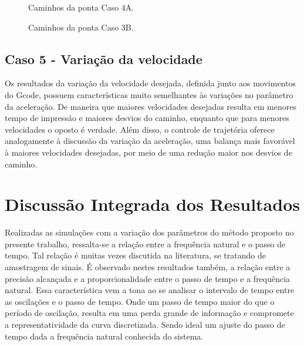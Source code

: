 \begin{figure}[H]
    \centering
    \hfill
    \caption{Caminhos da ponta Caso 4A.}
    \label{fig:4A_cam_p_s}
\end{figure}

\begin{figure}[H]
    \centering
    \hfill
    \caption{Caminhos da ponta Caso 3B.}
    \label{fig:4B_cam_p_s}
\end{figure}

\subsection{Caso 5 - Variação da velocidade}
Os resultados da variação da velocidade desejada, definida junto aos movimentos do Gcode, possuem características muito semelhantes às variações no parâmetro da aceleração. De maneira que maiores velocidades desejadas resulta em menores tempo de impressão e maiores desvios do caminho, enquanto que para menores velocidades o oposto é verdade. Além disso, o controle de trajetória oferece analogamente à discussão da variação da aceleração, uma balança mais favorável à maiores velocidades desejadas, por meio de uma redução maior nos desvios de caminho.

\section{Discussão Integrada dos Resultados}
Realizadas as simulações com a variação dos parâmetros do método proposto no presente trabalho, ressalta-se a relação entre a frequência natural e o passo de tempo. Tal relação é muitas vezes discutida na literatura, se tratando de amostragem de sinais. É observado nestes resultados também, a relação entre a precisão alcançada e a proporcionalidade entre o passo de tempo e a frequência natural. Essa característica vem a tona ao se analisar o intervalo de tempo entre as oscilações e o passo de tempo. Onde um passo de tempo maior do que o período de oscilação, resulta em uma perda grande de informação e compromete a representatividade da curva discretizada. Sendo ideal um ajuste do passo de tempo dada a frequência natural conhecida do sistema.

